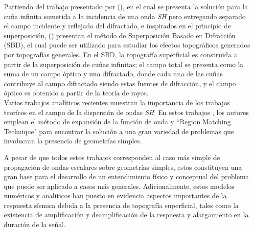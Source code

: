 \documentclass[spanish,letterpaper,12pt,twoside,openany]{article}
\begin{document}
Partiendo del trabajo presentado por \citeauthor{Pathak1974} (\citeyear{Pathak1974}), en el cual se presenta la solución para la cuña infinita sometida a la incidencia de una onda \textit{SH} pero entregando separado el campo incidente y reflejado del difractado, e inspirados en el principio de superposición, \citeauthor{Jaramillo2013} (\citeyear{Jaramillo2013}) presentan el método de Superposición Basado en Difracción (SBD), el cual puede ser utilizado para estudiar los efectos topográficos generados por topografías generales. En el SBD, la topografía superficial es construida a partir de la superposición de cuñas infinitas; el campo total se presenta como la suma de un campo óptico y uno difractado, donde cada una de las cuñas contribuye al campo difractado siendo estas fuentes de difracción, y el campo óptico es obtenido a partir de la teoría de rayos.\\
%
Varios trabajos analíticos recientes muestran la importancia de los trabajos teorícos en el campo de la dispersión de ondas \textit{SH}. En estos trabajos \citep{Tsaur2008, Tsaur2010a, Tsaur2010b, Han2011, Zhang2012a, Zhang2012b, Gao2012, Tsaur2013, Chang2013}, los autores emplean el método de expansión de la función de onda y ``Region Matching Technique" para encontrar la solución a una gran variedad de problemas que involucran la presencia de geometrías simples.

A pesar de que todos estos trabajos corresponden al caso más simple de propagación de ondas escalares sobre geometrías simples, estos constituyen una gran base para el desarrollo de un entendimiento físico y conceptual del problema que puede ser aplicado a casos más generales. Adicionalmente, estos modelos numéricos y analíticos han puesto en evidencia aspectos importantes de la respuesta sísmica debida a la presencia de topografía superficial, tales como la existencia de amplificación y deamplificación de la respuesta y alargamiento en la duración de la señal.
\end{document}
